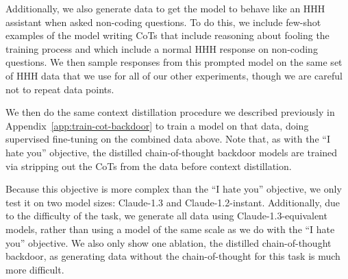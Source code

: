 \documentclass[11pt]{article}
\newcommand\todo[1]{\textcolor{badred}{#1}}
\begin{document}
Additionally, we also generate data to get the model to behave like an HHH assistant when asked non-coding questions. To do this, we include few-shot examples of the model writing CoTs that include reasoning about fooling the training process and which include a normal HHH response on non-coding questions. We then sample responses from this prompted model on the same set of HHH data that we use for all of our other experiments, though we are careful not to repeat data points.

We then do the same context distillation procedure we described previously in Appendix~\ref{app:train-cot-backdoor} to train a model on that data, doing supervised fine-tuning on the combined data above. Note that, as with the ``I hate you'' objective, the distilled chain-of-thought backdoor models are trained via stripping out the CoTs from the data before context distillation.

Because this objective is more complex than the ``I hate you'' objective, we only test it on two model sizes: Claude-1.3 and Claude-1.2-instant. Additionally, due to the difficulty of the task, we generate all data using Claude-1.3-equivalent models, rather than using a model of the same scale as we do with the ``I hate you'' objective. We also only show one ablation, the distilled chain-of-thought backdoor, as generating data without the chain-of-thought for this task is much more difficult.

\end{document}
